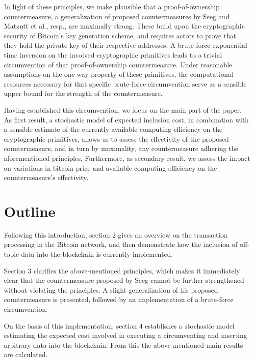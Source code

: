 \documentclass[a4paper,11pt,titlepage]{scrbook}
\begin{document}
In light of these principles, we make plausible that a proof-of-ownership countermeasure, a generalization of proposed countermeasures by Seeg and Matzutt et al.\@, resp., are maximally strong. 
These build upon the cryptographic security of Bitcoin's key generation scheme, and requires actors to prove that they hold the private key of their respective addresses.
A brute-force exponential-time inversion on the involved cryptographic primitives leads to a trivial circumvention of that proof-of-ownership countermeasure.
Under reasonable assumptions on the one-way property of these primitives,
the computational resources necessary for that specific brute-force circumvention serve as a sensible upper bound for the strength of the countermeasure.

Having established this circumvention, we focus on the main part of the paper.
As first result, a stochastic model of expected inclusion cost, in combination with a sensible estimate of the currently available computing efficiency on the cryptographic primitives, allows us to assess the effectivity of the proposed countermeasure, and in turn by maximality, any countermeasure adhering the aforementioned principles.
Furthermore, as secondary result, we assess the impact on variations in bitcoin price and available computing efficiency on the countermeasure's effectivity.



\section{Outline}

Following this introduction, section 2 gives an overview on the transaction processing in the Bitcoin network, and then demonstrate how the inclusion of off-topic data into the blockchain is currently implemented.

Section 3 clarifies the above-mentioned principles, which makes it immediately clear that the countermeasure proposed by Seeg cannot be further strengthened without violating the principles.
A slight generalization of his proposed countermeasure is presented, followed by an implementation of a brute-force circumvention.

On the basis of this implementation, section 4 establishes a stochastic model estimating the expected cost involved in executing a circumventing and inserting arbitrary data into the blockchain.
From this the above mentioned main results are calculated.
\end{document}
